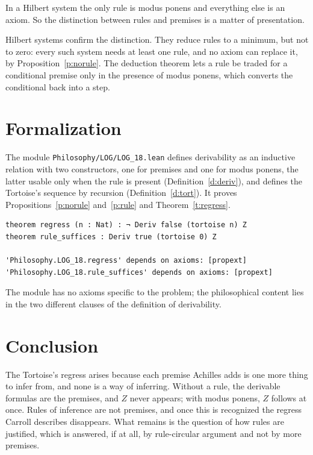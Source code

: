 \documentclass{situationist-preprint}
\begin{document}
\begin{objection}
In a Hilbert system the only rule is modus ponens and everything else is an axiom. So the distinction between rules and premises is a matter of presentation.
\end{objection}

\begin{reply}
Hilbert systems confirm the distinction. They reduce rules to a minimum, but not to zero: every such system needs at least one rule, and no axiom can replace it, by Proposition~\ref{p:norule}. The deduction theorem lets a rule be traded for a conditional premise only in the presence of modus ponens, which converts the conditional back into a step.
\end{reply}

\section{Formalization}

The module \nolinkurl{Philosophy/LOG/LOG_18.lean} defines derivability as an inductive relation with two constructors, one for premises and one for modus ponens, the latter usable only when the rule is present (Definition~\ref{d:deriv}), and defines the Tortoise's sequence by recursion (Definition~\ref{d:tort}). It proves Propositions~\ref{p:norule} and~\ref{p:rule} and Theorem~\ref{t:regress}.

\begin{lstlisting}
theorem regress (n : Nat) : ¬ Deriv false (tortoise n) Z
theorem rule_suffices : Deriv true (tortoise 0) Z

'Philosophy.LOG_18.regress' depends on axioms: [propext]
'Philosophy.LOG_18.rule_suffices' depends on axioms: [propext]
\end{lstlisting}

The module has no axioms specific to the problem; the philosophical content lies in the two different clauses of the definition of derivability.

\section{Conclusion}

The Tortoise's regress arises because each premise Achilles adds is one more thing to infer from, and none is a way of inferring. Without a rule, the derivable formulas are the premises, and $Z$ never appears; with modus ponens, $Z$ follows at once. Rules of inference are not premises, and once this is recognized the regress Carroll describes disappears. What remains is the question of how rules are justified, which is answered, if at all, by rule-circular argument and not by more premises.
\end{document}
